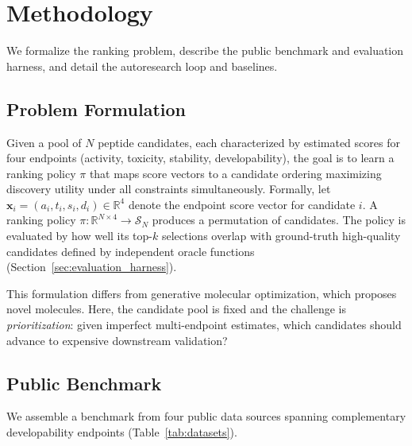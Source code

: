 \section{Methodology}
\label{sec:methodology}

We formalize the ranking problem, describe the public benchmark and evaluation harness, and detail the autoresearch loop and baselines.

\subsection{Problem Formulation}
\label{sec:problem}

Given a pool of $N$ peptide candidates, each characterized by estimated scores for four endpoints (activity, toxicity, stability, developability), the goal is to learn a ranking policy $\pi$ that maps score vectors to a candidate ordering maximizing discovery utility under all constraints simultaneously.
Formally, let $\mathbf{x}_i = (a_i, t_i, s_i, d_i) \in \mathbb{R}^4$ denote the endpoint score vector for candidate $i$.
A ranking policy $\pi: \mathbb{R}^{N \times 4} \to \mathcal{S}_N$ produces a permutation of candidates.
The policy is evaluated by how well its top-$k$ selections overlap with ground-truth high-quality candidates defined by independent oracle functions (Section~\ref{sec:evaluation_harness}).

This formulation differs from generative molecular optimization, which proposes novel molecules.
Here, the candidate pool is fixed and the challenge is \emph{prioritization}: given imperfect multi-endpoint estimates, which candidates should advance to expensive downstream validation?

\subsection{Public Benchmark}
\label{sec:benchmark}

We assemble a benchmark from four public data sources spanning complementary developability endpoints (Table~\ref{tab:datasets}).

